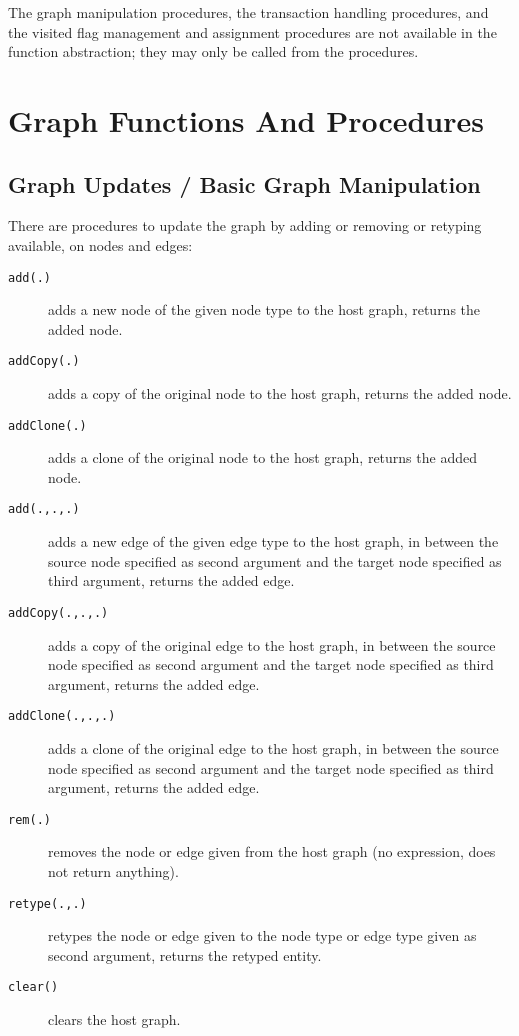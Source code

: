 The graph manipulation procedures, the transaction handling procedures, and the visited flag management and assignment procedures are not available in the function abstraction; they may only be called from the procedures.

\section{Graph Functions And Procedures}\label{neighbouringelementsfunctions}

\subsection{Graph Updates / Basic Graph Manipulation}

There are procedures to update the graph by adding or removing or retyping available, on nodes and edges: 

\begin{description}
\item[\texttt{add(.)}] adds a new node of the given node type to the host graph, returns the added node.
\item[\texttt{addCopy(.)}] adds a copy of the original node to the host graph, returns the added node.
\item[\texttt{addClone(.)}] adds a clone of the original node to the host graph, returns the added node.
\item[\texttt{add(.,.,.)}] adds a new edge of the given edge type to the host graph, in between the source node specified as second argument and the target node specified as third argument, returns the added edge.
\item[\texttt{addCopy(.,.,.)}] adds a copy of the original edge to the host graph, in between the source node specified as second argument and the target node specified as third argument, returns the added edge.
\item[\texttt{addClone(.,.,.)}] adds a clone of the original edge to the host graph, in between the source node specified as second argument and the target node specified as third argument, returns the added edge.
\item[\texttt{rem(.)}] removes the node or edge given from the host graph (no expression, does not return anything).
\item[\texttt{retype(.,.)}] retypes the node or edge given to the node type or edge type given as second argument, returns the retyped entity.
\item[\texttt{clear()}] clears the host graph.
\end{description}

